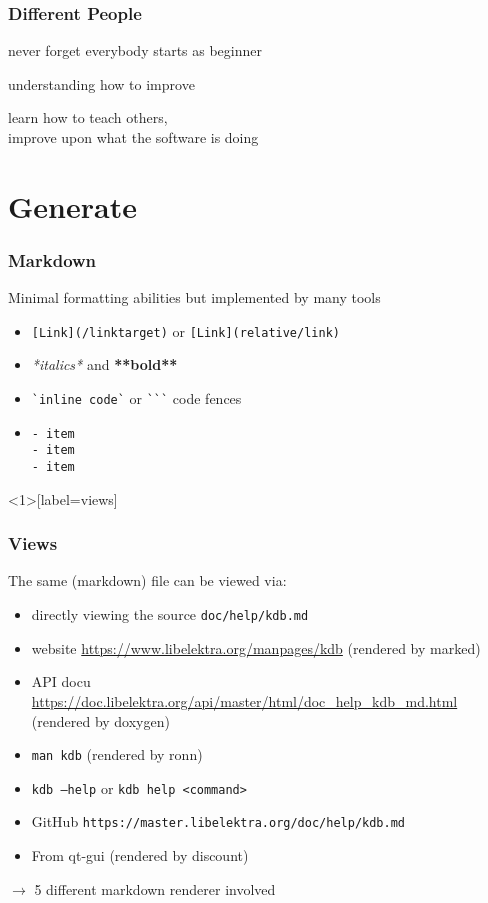 \begin{frame}
	\frametitle{Different People}

	\begin{description}[<+-| alert@+>]
	\item[beginners] never forget everybody starts as beginner
	\item[advanced] understanding how to improve
	\item[expert] learn how to teach others, \\
		improve upon what the software is doing
	\end{description}
\end{frame}

\section{Generate}

\begin{frame}[fragile]
	\frametitle{Markdown}

	Minimal formatting abilities but implemented by many tools

	\begin{itemize}[<+-| alert@+>]
	\item \texttt{[Link](/linktarget)} or \texttt{[Link](relative/link)}
	\item \textit{*italics*} and \textbf{**bold**}
	\item \verb+`inline code`+ or \verb+```+ code fences
	\item \begin{verbatim}- item
- item
- item\end{verbatim}
	\end{itemize}
\end{frame}

\begin{frame}<1>[label=views]
	\frametitle{Views}

	The same (markdown) file can be viewed via:
	
	\begin{itemize}[<+-| alert@+>]
	\item directly viewing the source \texttt{doc/help/kdb.md}
	\item website \url{https://www.libelektra.org/manpages/kdb} (rendered by marked)
	\item API docu \url{https://doc.libelektra.org/api/master/html/doc_help_kdb_md.html} (rendered by doxygen)
	\item \texttt{man kdb} (rendered by ronn)
	\item \texttt{kdb --help} or \texttt{kdb help <command>}
	\item GitHub \texttt{https://master.libelektra.org/doc/help/kdb.md}
	\item From qt-gui (rendered by discount)
	\end{itemize}

	\pause[\thebeamerpauses]  %

	$\rightarrow$ 5 different markdown renderer involved
\end{frame}

